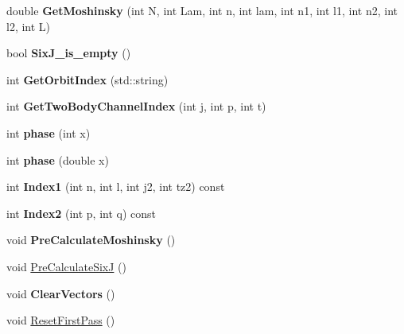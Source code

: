 \begin{DoxyCompactItemize}
\item 
\mbox{\label{classModelSpace_a85f0b95b2cd46504702ea80489455beb}} 
double {\bfseries Get\+Moshinsky} (int N, int Lam, int n, int lam, int n1, int l1, int n2, int l2, int L)
\item 
\mbox{\label{classModelSpace_aae435e6ade2addd7787e7948a3ae542c}} 
bool {\bfseries Six\+J\+\_\+is\+\_\+empty} ()
\item 
\mbox{\label{classModelSpace_a8371ea382fe9d2da04e37c220eb3c766}} 
int {\bfseries Get\+Orbit\+Index} (std\+::string)
\item 
\mbox{\label{classModelSpace_ae73e211248e6f2bd4cc1bb0f030144ce}} 
int {\bfseries Get\+Two\+Body\+Channel\+Index} (int j, int p, int t)
\item 
\mbox{\label{classModelSpace_a6b4d1686088e3fef492df10bbd806fe2}} 
int {\bfseries phase} (int x)
\item 
\mbox{\label{classModelSpace_a07d1c8f00131cc6c192d440e6be329f3}} 
int {\bfseries phase} (double x)
\item 
\mbox{\label{classModelSpace_a1e107e6c7434840fb4fc66316baf3b76}} 
int {\bfseries Index1} (int n, int l, int j2, int tz2) const
\item 
\mbox{\label{classModelSpace_aaa18a8d362125121bea49e7638fea140}} 
int {\bfseries Index2} (int p, int q) const
\item 
\mbox{\label{classModelSpace_abc436144ee034558058227cac872ecb9}} 
void {\bfseries Pre\+Calculate\+Moshinsky} ()
\item 
void \hyperlink{classModelSpace_abd5c59215d553bd2db47120d2db4b2ea}{Pre\+Calculate\+SixJ} ()
\item 
\mbox{\label{classModelSpace_a25aad2961ae99cdd528c4d71bb689d95}} 
void {\bfseries Clear\+Vectors} ()
\item 
void \hyperlink{classModelSpace_a3354ef5c4dbcae5786759696ab500951}{Reset\+First\+Pass} ()
\item 

\end{DoxyCompactItemize}
